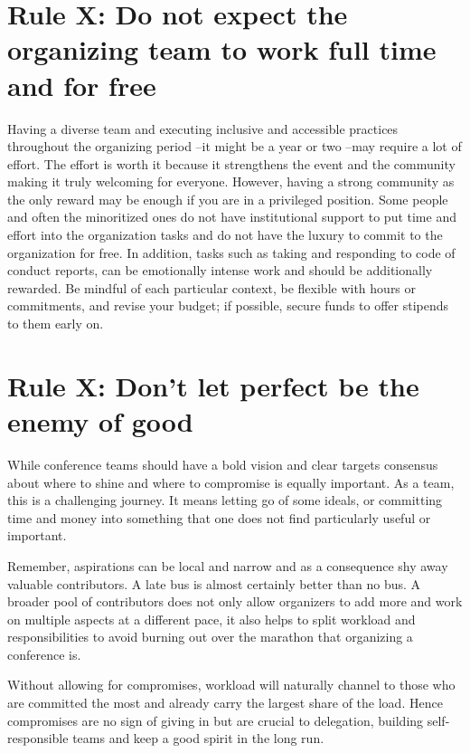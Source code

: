 \documentclass[10pt,letterpaper]{article}
\begin{document}
\section{Rule X: Do not expect the organizing team to work full time and for free}

Having a diverse team and executing inclusive and accessible practices throughout the organizing period --it might be a year or two --may require a lot of effort. The effort is worth it because it strengthens the event and the community making it truly welcoming for everyone. However, having a strong community as the only reward may be enough if you are in a privileged position. Some people and often the minoritized ones do not have institutional support to put time and effort into the organization tasks and do not have the luxury to commit to the organization for free. In addition, tasks such as taking and responding to code of conduct reports, can be emotionally intense work and should be additionally rewarded. Be mindful of each particular context, be flexible with hours or commitments, and revise your budget; if possible, secure funds to offer stipends to them early on. 


\section{Rule X: Don't let perfect be the enemy of good}
 While conference teams should have a bold vision and clear targets consensus about where to shine and where to compromise is equally important. As a team, this is a challenging journey. It means letting go of some ideals, or committing time and money into something that one does not find particularly useful or important.

Remember, aspirations can be local and narrow and as a consequence shy away valuable contributors. A late bus is almost certainly better than no bus. A broader pool of contributors does not only allow organizers to add more and work on multiple aspects at a different pace, it also helps to split workload and responsibilities to avoid burning out over the marathon that organizing a conference is.

Without allowing for compromises, workload will naturally channel to those who are committed the most and already carry the largest share of the load. Hence compromises are no sign of giving in but are crucial to delegation, building self-responsible teams and keep a good spirit in the long run.   
\end{document}
